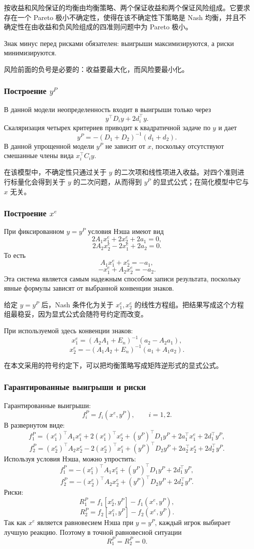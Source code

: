 \documentclass[12pt,a4paper]{article}
\newcommand{\zh}[1]{\par\noindent #1\par}
\begin{document}
\zh{按收益和风险保证的均衡由均衡策略、两个保证收益和两个保证风险组成。它要求存在一个 Pareto 极小不确定性，使得在该不确定性下策略是 Nash 均衡，并且不确定性在由收益和负风险组成的四准则问题中为 Pareto 极小。}

Знак минус перед рисками обязателен: выигрыши максимизируются, а риски минимизируются.

\zh{风险前面的负号是必要的：收益要最大化，而风险要最小化。}

\subsubsection{Построение $y^P$}
В данной модели неопределенность входит в выигрыши только через
\[
y^\top D_i y+2d_i^\top y.
\]
Скаляризация четырех критериев приводит к квадратичной задаче по $y$ и дает
\[
y^P=-(D_1+D_2)^{-1}(d_1+d_2).
\]
В данной упрощенной модели $y^P$ не зависит от $x$, поскольку отсутствуют смешанные члены вида $x_i^\top C_i y$.

\zh{在该模型中，不确定性只通过关于 $y$ 的二次项和线性项进入收益。对四个准则进行标量化会得到关于 $y$ 的二次问题，从而得到 $y^P$ 的显式公式；在简化模型中它与 $x$ 无关。}

\subsubsection{Построение $x^e$}
При фиксированном $y=y^P$ условия Нэша имеют вид
\[
2A_1x_1^e+2x_2^e+2a_1=0,
\]
\[
2A_2x_2^e-2x_1^e+2a_2=0.
\]
То есть
\[
A_1x_1^e+x_2^e=-a_1,
\]
\[
-x_1^e+A_2x_2^e=-a_2.
\]
Эта система является самым надежным способом записи результата, поскольку явные формулы зависят от выбранной конвенции знаков.

\zh{给定 $y=y^P$ 后，Nash 条件化为关于 $x_1^e,x_2^e$ 的线性方程组。把结果写成这个方程组最稳妥，因为显式公式会随符号约定而改变。}

При используемой здесь конвенции знаков:
\[
x_1^e=(A_2A_1+E_n)^{-1}(a_2-A_2a_1),
\]
\[
x_2^e=-(A_1A_2+E_n)^{-1}(a_1+A_1a_2).
\]

\zh{在本文采用的符号约定下，可以把均衡策略写成矩阵逆形式的显式公式。}

\subsubsection{Гарантированные выигрыши и риски}
Гарантированные выигрыши:
\[
f_i^P=f_i(x^e,y^P),
\qquad i=1,2.
\]
В развернутом виде:
\[
f_1^P=(x_1^e)^\top A_1x_1^e+2(x_1^e)^\top x_2^e+(y^P)^\top D_1y^P+2a_1^\top x_1^e+2d_1^\top y^P,
\]
\[
f_2^P=(x_2^e)^\top A_2x_2^e-2(x_2^e)^\top x_1^e+(y^P)^\top D_2y^P+2a_2^\top x_2^e+2d_2^\top y^P.
\]
Используя условия Нэша, можно упростить:
\[
f_1^P=-(x_1^e)^\top A_1x_1^e+(y^P)^\top D_1y^P+2d_1^\top y^P,
\]
\[
f_2^P=-(x_2^e)^\top A_2x_2^e+(y^P)^\top D_2y^P+2d_2^\top y^P.
\]
Риски:
\[
R_1^P=f_1[x_2^e,y^P]-f_1(x^e,y^P),
\]
\[
R_2^P=f_2[x_1^e,y^P]-f_2(x^e,y^P).
\]
Так как $x^e$ является равновесием Нэша при $y=y^P$, каждый игрок выбирает лучшую реакцию. Поэтому в точной равновесной ситуации
\[
R_1^P=R_2^P=0.
\]
\end{document}
